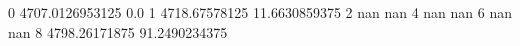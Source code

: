 0 4707.0126953125 0.0
1 4718.67578125 11.6630859375
2 nan nan
4 nan nan
6 nan nan
8 4798.26171875 91.2490234375
